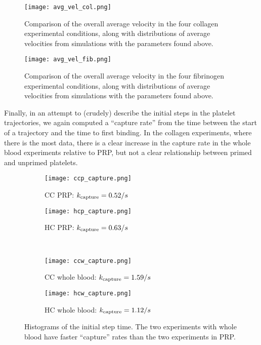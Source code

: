 \documentclass{article}
\newcommand{\tn}{\textnormal}
\begin{document}
\begin{figure}
  \centering
  \texttt{[image: avg\_vel\_col.png]}
  \caption{Comparison of the overall average velocity in the four
    collagen experimental conditions, along with distributions of
    average velocities from simulations with the parameters found
    above.}
  \label{fig:avg-vel-col}
\end{figure}

\begin{figure}
  \centering
  \texttt{[image: avg\_vel\_fib.png]}
  \caption{Comparison of the overall average velocity in the four
    fibrinogen experimental conditions, along with distributions of
    average velocities from simulations with the parameters found
    above.}
  \label{fig:avg-vel-fib}
\end{figure}

Finally, in an attempt to (crudely) describe the initial steps in the platelet
trajectories, we again computed a ``capture rate'' from the time
between the start of a trajectory and the time to first binding. In
the collagen experiments, where there is the most data, there is a
clear increase in the capture rate in the whole blood experiments
relative to PRP, but not a clear relationship between primed and
unprimed platelets.

\begin{figure}
  \centering
  \begin{subfigure}{0.48\textwidth}
    \texttt{[image: ccp\_capture.png]}
    \caption{CC PRP: $k_\tn{capture} = 0.52 / s$}
  \end{subfigure}
  \hfill
  \begin{subfigure}{0.48\textwidth}
    \texttt{[image: hcp\_capture.png]}
    \caption{HC PRP: $k_\tn{capture} = 0.63 / s$}
  \end{subfigure}
  \\
  \begin{subfigure}{0.48\textwidth}
    \texttt{[image: ccw\_capture.png]}
    \caption{CC whole blood: $k_\tn{capture} = 1.59 / s$}
  \end{subfigure}
  \hfill
  \begin{subfigure}{0.48\textwidth}
    \texttt{[image: hcw\_capture.png]}
    \caption{HC whole blood: $k_\tn{capture} = 1.12 / s$}
  \end{subfigure}
  \caption{Histograms of the initial step time. The two experiments
    with whole blood have faster ``capture'' rates than the two
    experiments in PRP.}
  \label{fig:col-capture}
\end{figure}
\end{document}
